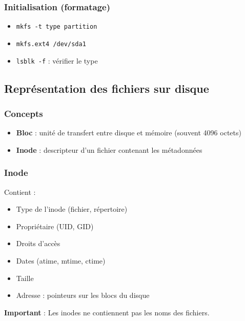 \documentclass[12pt,a4paper]{article}
\begin{document}
\subsubsection{Initialisation (formatage)}
\begin{itemize}
    \item \texttt{mkfs -t type partition}
    \item \texttt{mkfs.ext4 /dev/sda1}
    \item \texttt{lsblk -f} : v\'erifier le type
\end{itemize}

\subsection{Repr\'esentation des fichiers sur disque}

\subsubsection{Concepts}
\begin{itemize}
    \item \textbf{Bloc} : unit\'e de transfert entre disque et m\'emoire (souvent 4096 octets)
    \item \textbf{Inode} : descripteur d'un fichier contenant les m\'etadonn\'ees
\end{itemize}


\subsubsection{Inode}
Contient :
\begin{itemize}
    \item Type de l'inode (fichier, r\'epertoire) %
    \item Propri\'etaire (UID, GID) %
    \item Droits d'acc\`es %
    \item Dates (atime, mtime, ctime) %
    \item Taille %
    \item Adresse : pointeurs sur les blocs du disque %
\end{itemize}
\textbf{Important} : Les inodes ne contiennent pas les noms des fichiers. %
\end{document}
